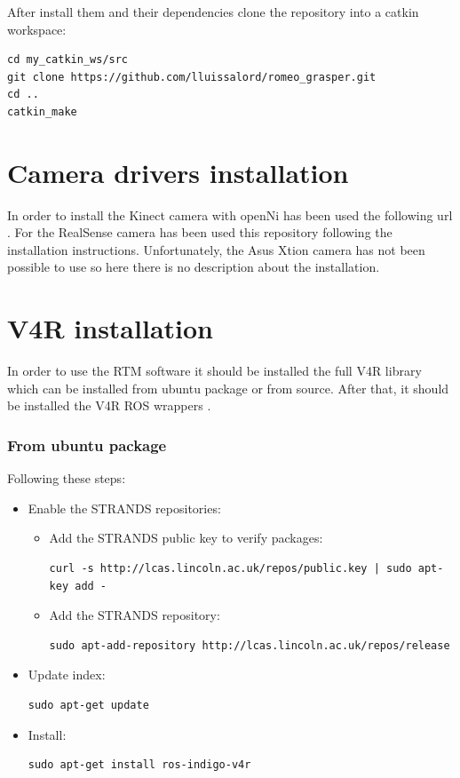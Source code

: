 \documentclass[12pt,a4paper,final,twoside,openright]{report}
\begin{document}
After install them and their dependencies clone the repository into a catkin workspace:

\begin{lstlisting}[language=Git]
cd my_catkin_ws/src
git clone https://github.com/lluissalord/romeo_grasper.git
cd ..
catkin_make
\end{lstlisting}

\section{Camera drivers installation}
\label{app:camera_instal}

In order to install the Kinect camera with openNi has been used the following url \cite{Li}. For the RealSense camera has been used this repository \cite{gitRealSense} following the installation instructions. Unfortunately, the Asus Xtion camera has not been possible to use so here there is no description about the installation.

\section{V4R installation}

In order to use the RTM software it should be installed the full V4R library which can  be installed from ubuntu package or from source. After that, it should be installed the V4R ROS wrappers \cite{gitV4RWrappers}.

\newpage
\subsubsection{From ubuntu package}
	
Following these steps:

\begin{itemize}
\item Enable the STRANDS repositories:
\begin{itemize}
\item Add the STRANDS public key to verify packages: 
\begin{lstlisting}[language=Git]
curl -s http://lcas.lincoln.ac.uk/repos/public.key | sudo apt-key add -
\end{lstlisting}
\item Add the STRANDS repository:  
\begin{lstlisting}[language=Git]
sudo apt-add-repository http://lcas.lincoln.ac.uk/repos/release
\end{lstlisting}
\end{itemize}
\item Update index:
\begin{lstlisting}[language=Git]
sudo apt-get update
\end{lstlisting}
\item Install:
\begin{lstlisting}[language=Git]
sudo apt-get install ros-indigo-v4r
\end{lstlisting}
\end{itemize}
\end{document}
